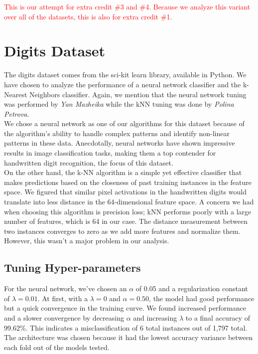 \documentclass{article}
\begin{document}
\textcolor{red}{This is our attempt for extra credit \#3 and \#4. Because we analyze this variant over all of the datasets, this is also for extra credit \#1.}


\newpage
\section*{Digits Dataset}

The digits dataset comes from the sci-kit learn library, available in Python. We have chosen to analyze the performance of a neural network classifier and the k-Nearest Neighbors classifier. Again, we mention
that the neural network tuning was performed by \textit{Yan Mazheika} while the kNN tuning was done by \textit{Polina Petrova}.
\\

We chose a neural network as one of our algorithms for this dataset because of the algorithm's ability to
handle complex patterns and identify non-linear patterns in these data. Anecdotally, neural networks have shown
impressive results in image classification tasks, making them a top contender for handwritten digit recognition, the focus of this dataset.
\\

On the other hand, the k-NN algorithm is a simple yet effective classifier that makes predictions based on the closeness of past training instances in the feature space. We figured that similar pixel activations in the handwritten digits
would translate into less distance in the 64-dimensional feature space. A concern we had when choosing this algorithm is precision loss; kNN performs poorly with a large number of features, which is 64 in our case. The distance measurement between two instances
converges to zero as we add more features and normalize them. However, this wasn't a major problem in our analysis.

\subsection*{Tuning Hyper-parameters}
For the neural network, we've chosen an $\alpha$ of 0.05 and a regularization constant of $\lambda=0.01$. At first, with a $\lambda=0$ and $\alpha=0.50$, the model had good performance but a quick convergence in the training curve.
We found increased performance and a slower convergence by decreasing $\alpha$ and increasing $\lambda$ to a final accuracy of 99.62\%. This indicates a misclassification of 6 total instances out of 1,797 total.
The architecture was chosen because it had the lowest accuracy variance between each fold out of the models tested.
\\
\end{document}
